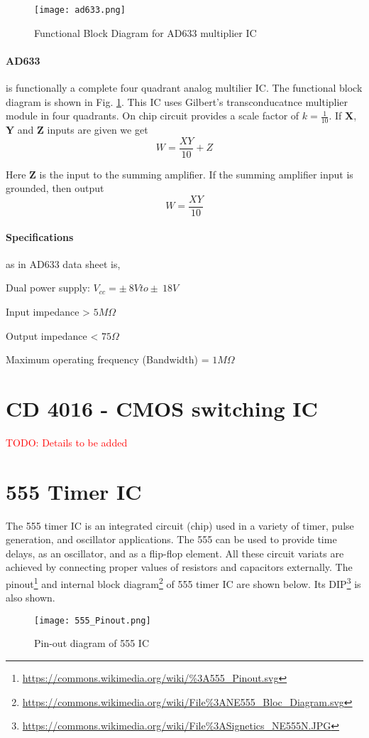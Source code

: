 \begin{figure}[h]
\texttt{[image: ad633.png]}
\caption{Functional Block Diagram for AD633 multiplier IC}
\label{ad633}
\end{figure}

\paragraph{AD633} is functionally a complete four quadrant analog multilier IC. The functional block diagram is shown in Fig. \ref{ad633}. This IC uses Gilbert's transconducatnce multiplier module in four quadrants. On chip circuit provides a scale factor of $k=\frac{1}{10}$. If $\textbf{X}$, $\textbf{Y}$ and $\textbf{Z}$ inputs are given we get 
\begin{equation}
W=\frac{XY}{10}+Z
\end{equation}

Here $\textbf{Z}$ is the input to the summing amplifier. If the summing amplifier input is grounded, then output 
\begin{equation}
W=\frac{XY}{10}
\end{equation}

\paragraph{Specifications}as in AD633 data sheet is,

\noindent Dual power supply: $V_{cc}= \pm \ 8V to \pm \ 18V$

\noindent Input impedance > $5 M \Omega$

\noindent Output impedance < $75  \Omega$

\noindent Maximum operating frequency (Bandwidth) = $1 M\Omega$

\section{CD 4016 - CMOS switching IC}
\textcolor{red}{TODO: Details to be added}


\section{555 Timer IC}
\label{555}

The 555 timer IC is an integrated circuit (chip) used in a variety of timer, pulse generation, and oscillator applications. The 555 can be used to provide time delays, as an oscillator, and as a flip-flop element. All these circuit variats are achieved by connecting proper values of resistors and capacitors externally.
The pinout\footnote{\url{https://commons.wikimedia.org/wiki/\%3A555_Pinout.svg}} and internal block diagram\footnote{\url{https://commons.wikimedia.org/wiki/File\%3ANE555_Bloc_Diagram.svg}} of 555 timer IC are shown below.
Its DIP\footnote{\url{https://commons.wikimedia.org/wiki/File\%3ASignetics_NE555N.JPG}} is also shown.
\begin{figure}[h]
\texttt{[image: 555\_Pinout.png]}
\caption{Pin-out diagram of 555 IC}
\end{figure}


